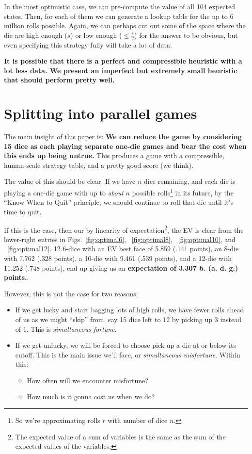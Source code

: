 \documentclass[11pt, oneside]{article} 	%
\begin{document}
In the most optimistic case, we can pre-compute the value of all 104 expected states. Then, for each of them we can generate a lookup table for the up to 6 million rolls possible. Again, we can perhaps cut out some of the space where the die are high enough ($s$) or low enough ($\leq \frac{s}{2}$) for the answer to be obvious, but even specifying this strategy fully will take a lot of data. 

\textbf{It is possible that there is a perfect and compressible heuristic with a lot less data. We present an imperfect but extremely small heuristic that should perform pretty well.}

\section{Splitting into parallel games} \label{section:split-out}

The main insight of this paper is: \textbf{We can reduce the game by considering 15 dice as each playing separate one-die games and bear the cost when this ends up being untrue.}  This produces a game with a compressible, human-scale strategy table, and a pretty good score (we think).

The value of this should be clear. If we have $n$ dice remaining, and each die is playing a one-die game with up to \emph{about} $n$ possible rolls\footnote{So we're approximating rolls $r$ with number of dice $n$.} in its future, by the ``Know When to Quit'' principle, we should continue to roll that die until it's time to quit.

If this is the case, then our by linearity of expectation\footnote{The expected value of a sum of variables is the same as the sum of the expected values of the variables.}, the EV is clear from the lower-right entries in Figs.~\ref{fig:optimal6}, ~\ref{fig:optimal8}, ~\ref{fig:optimal10}, and ~\ref{fig:optimal12}. 12 6-dice with an EV best face of 5.859 (.141 points), an 8-die with 7.762 (.328 points), a 10-die with 9.461 (.539 points), and a 12-die with 11.252 (.748 points), end up giving us an \textbf{expectation of 3.307 b. (a. d. g.) points.}.

However, this is not the case for two reasons:
\begin{itemize}
\item If we get lucky and start bagging lots of high rolls, we have fewer rolls ahead of us as we might ``skip'' from, say 15 dice left to 12 by picking up 3 instead of 1. This is \emph{simultaneous fortune}.
\item If we get unlucky, we will be forced to choose pick up a die at or below its cutoff. This is the main issue we'll face, or \emph{simultaneous misfortune}. Within this:
  \begin{itemize}
  \item How often will we encounter misfortune?
  \item How much is it gonna cost us when we do?
  \end{itemize}
\end{itemize}
\end{document}
